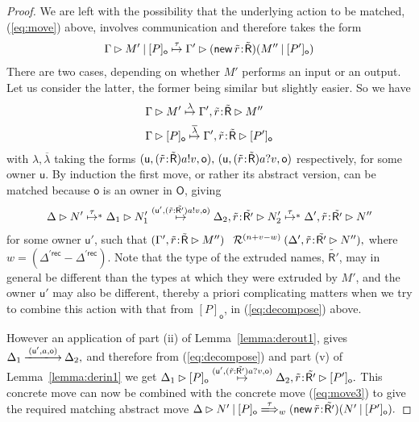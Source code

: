 \documentclass{LMCS}
\newcommand{\pfn}[1]{\mathsf{#1}}  \newcommand{\cfn}[1]{\mathsf{#1}}  \newcommand{\ownfnt}[1]{{\mathsf{#1}}}
\newcommand{\with}{\mathbin \rhd}
\newcommand{\cancom}[3]{({\ownfnt{#1}},{#2},{\ownfnt{#3}}) \xspace}
\newcommand{\record}{{\scriptstyle \mathsf{rec}}}
\newcommand{\ownO}{ {\ownfnt O}}
\newcommand{\typeletter}[1]{{\mathsf{#1}}}
\newcommand{\tR}{\typeletter{R}}
\newcommand{\calR}{\mathbin{\mathcal{R}}}
\newcommand{\Cassoc}[2]{ {{#1}\kern -0.2em : \kern -0.2em {#2}}}
\newcommand{\Cnew}[2]{(\mathop{\pfn{new}} \Cassoc{#1}{#2})}
\newcommand{\Cpar}{\mathbin{|}}
\newcommand{\Cloc}[2]{[#1]_{\ownfnt{#2}}}
\newcommand{\ar}[1]{\mathbin{\xlongrightarrow{ #1}}}
\newcommand{\dar}[1]{\xLongrightarrow{\vspace{-2em}#1}}
\begin{document}
\begin{proof}
We are left with the possibility that the underlying action to be matched, (\ref{eq:move}) 
above, involves
communication and therefore takes the form
\begin{align*}
  \Gamma \with M' \Cpar \Cloc{P}{o}  \newar{\tau} \Gamma' \with \Cnew{\tilde{r}}{\tilde{\tR}} ( M'' \Cpar \Cloc{P'}{o})
\end{align*}
There are two cases, depending on whether $M'$ performs an input or an output. Let us consider the
latter, the former being similar but slightly easier. So we have
\begin{align}
  &\Gamma \with M' \newar{\lambda} \Gamma', \Cassoc{\tilde{r}}{\tilde{\tR}} \with M'' \notag
\\
  &\Gamma \with \Cloc{P}{o} \newar{\overline{\lambda}} \Gamma', \Cassoc{\tilde{r}}{\tilde{\tR}} \with \Cloc{P'}{o}  \label{eq:decompose}
\end{align}
with $\lambda, \overline{\lambda}$ taking the forms $\cancom{u}{ (\Cassoc{\tilde{r}}{\tilde{\tR}})a!v}{o},\, 
\cancom{u}{(\Cassoc{\tilde{r}}{\tilde{\tR}})a?v}{o}$ respectively, for some owner $\ownfnt u$.  
By induction the first move, or rather its abstract version,  can be matched  because $\ownfnt o$ is an owner in $\ownO$, giving 
\begin{align}\label{eq:move3}
  \Delta \with N' \newarstar{\tau}   
   \Delta_1 \with N'_1\newar{\cancom{u'}{(\tilde{r}:\tilde{\tR'}) a!v}{o}} 
   \Delta_2, \Cassoc{\tilde{r}}{\tilde{\tR'}} \with N'_2 \newarstar{\tau} 
      \Delta',  \Cassoc{\tilde{r}}{\tilde{\tR'}} \with N''
\end{align}
for some owner $\ownfnt u'$, such that 
\begin{math}
   (\Gamma', \Cassoc{\tilde{r}}{\tilde{\tR}} \with M'')  \;\;\calR^{(n+v-w)} 
   (\Delta',  \Cassoc{\tilde{r}}{\tilde{\tR'}} \with N''),
\end{math}
where $w = (\Delta^{'\record} - \Delta^{'\record})$. 
Note that the type of the extruded names, $\tilde{\tR'}$, may in general be different than the
types at which they were extruded by $M'$, and the owner $\ownfnt u'$ may also be different,
thereby a priori complicating matters when we try to combine this action with that from $\Cloc{P}{o}$, 
in (\ref{eq:decompose})
above. 

However an application of part (ii) of Lemma~\ref{lemma:derout1}, gives 
\begin{math}
   \Delta_1  \ar{\cancom{u'}{a}{o}} \Delta_2, 
\end{math}
and therefore from (\ref{eq:decompose}) and part (v) of Lemma~\ref{lemma:derin1} we get
\begin{math}
  \Delta_1 \with \Cloc{P}{o} \newar{ \cancom{u'}{(\tilde{r}:\tilde{\tR'}) a?v}{o}} 
\Delta_2, \Cassoc{\tilde{r}}{\tilde{\tR'}} \with \Cloc{P'}{o}.
\end{math}
This concrete move can now be combined with the concrete move (\ref{eq:move3}) to give the required matching
abstract move
\begin{math}
  \Delta \with N' \Cpar \Cloc{P}{o}   \dar{\tau}_w \Cnew{\tilde{r}}{\tilde{\tR'}} (N' \Cpar \Cloc{P'}{o}).
\end{math}
\end{proof}
\end{document}
